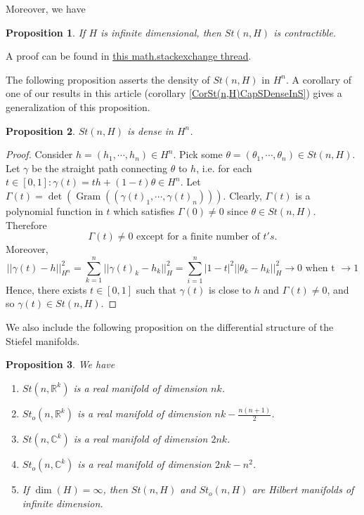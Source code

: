 \documentclass[a4paper,12pt]{article}
\DeclareMathOperator{\Gram}{Gram}
\theoremstyle{plain}
\newtheorem{proposition}{Proposition}[section]
\theoremstyle{definition}
\theoremstyle{remark}
\begin{document}
Moreover, we have

\begin{proposition} 
If $H$ is infinite dimensional, then $St(n,H)$ is contractible.
\end{proposition}

A proof can be found in \href{https://math.stackexchange.com/questions/199133/contractibility-of-the-sphere-and-stiefel-manifolds-of-a-separable-hilbert-space/200481}{this math.stackexchange thread}.

The following proposition asserts the density of $St(n,H)$ in $H^n$. A corollary of one of our results in this article (corollary \ref{CorSt(n,H)CapSDenseInS}) gives a generalization of this proposition.

\begin{proposition}
\label{PropSt(n,H)Dense}
$St(n,H)$ is dense in $H^n$.
\end{proposition}

\begin{proof}
Consider $h = (h_1,\cdots,h_n) \in H^n$. Pick some $\theta = (\theta_1,\cdots,\theta_n) \in St(n,H)$. Let $\gamma$ be the straight path connecting $\theta$ to $h$, i.e. for each $t \in [0,1] : \gamma(t) = th + (1-t)\theta \in H^n$. Let $\Gamma(t) = \det(\Gram ((\gamma(t)_1, \cdots,\gamma(t)_n)))$. Clearly, $\Gamma(t)$ is a polynomial function in $t$ which satisfies $\Gamma(0) \neq 0$ since $\theta \in St(n,H)$. Therefore 
\[ \Gamma(t) \neq 0 \text{ except for a finite number of } t's. \] 
Moreover, 
\[ ||\gamma(t) - h||_{H^n}^2 = \sum_{k=1}^n ||\gamma(t)_k - h_k||_{H}^2 = \sum_{i=1}^n |1-t|^2 ||\theta_k - h_k||_{H}^2 \to 0 \mbox{ when t } \to 1 \]
Hence, there exists $t \in [0,1]$ such that $\gamma(t)$ is close to $h$ and $\Gamma(t) \neq 0$, and so $\gamma(t) \in St(n,H)$.
\end{proof}

We also include the following proposition on the differential structure of the Stiefel manifolds.

\begin{proposition} \cite{James}
We have
\begin{enumerate}
\item $St(n,\mathbb{R}^k)$ is a real manifold of dimension $nk$.
\item $St_o(n,\mathbb{R}^k)$ is a real manifold of dimension $nk - \frac{n(n+1)}{2}$.
\item $St(n,\mathbb{C}^k)$ is a real manifold of dimension $2nk$.
\item $St_o(n,\mathbb{C}^k)$ is a real manifold of dimension $2nk-n^2$.
\item If $\dim(H)=\infty$, then $St(n,H)$ and $St_o(n,H)$ are Hilbert manifolds of infinite dimension.
\end{enumerate}
\end{proposition}
\end{document}
